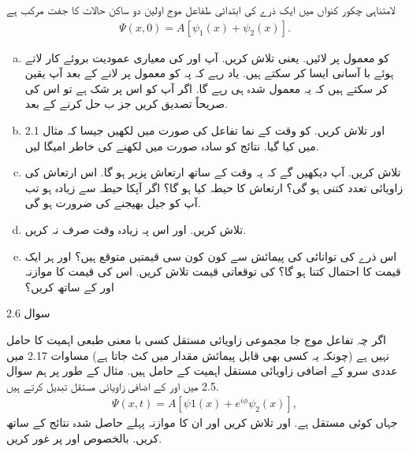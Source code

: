 لامتناہی چکور کنواں میں ایک ذرے کی ابتدائی طفاعل موج اولین دو ساکن حالات کا جفت مرکب ہے 
\begin{align*}
\Psi(x,0) = A[\psi_{1}(x) + \psi_{2}(x)].
\end{align*}
\begin{enumerate}[a.]
\item {} کو معمول پر لائیں. یعنی  تلاش کریں. آپ  اور  کی معیاری عمودیت بروئے کار لاتے ہوئے با آسانی ایسا کر سکتے ہیں. یاد رہے کہ  پہ  کو معمول پر لانے کے بعد آپ یقین کر سکتے ہیں کہ یہ معمول شدہ ہی رہے گا. اگر آپ کو اس پر شک ہے تو اس کی صریحاً تصدیق کریں جز ب حل کرنے کے بعد. 
\item
{} اور  تلاش کریں.  کو وقت کے  نما تفاعل کی صورت میں لکھیں جیسا کہ مثال 2.1 میں کیا گیا. نتائج کو سادہ صورت میں لکھنے کی خاطر امیگا لیں. 
\item 
{} تلاش کریں. آپ دیکھیں گے کہ یہ وقت کے ساتھ ارتعاش پزیر ہو گا. اس ارتعاش کی زاویائی تعدد کتنی ہو گی؟ ارتعاش کا حیطہ کیا ہو گا؟ اگر آپکا حیطہ  سے زیادہ ہو تب آپ کو جیل بھیجنے کی ضرورت ہو گی. 
\item 
{} تلاش کریں. اور اس پہ زیادہ وقت صرف نہ کریں. 
\item
اس ذرے کی توانائی کی پیمائش سے کون کون سی قیمتیں متوقع ہیں؟ اور ہر ایک قیمت کا احتمال کتنا ہو گا؟  کی توقعاتی قیمت تلاش کریں. اس کی قیمت کا موازنہ  اور  کے ساتھ کریں؟
\end{enumerate}

سوال 2.6

   
     
     
     
     
 
 
اگر چہ تفاعل موج جا مجموعی زاویائی مستقل کسی با معنی طبعی اہمیت کا حامل نہیں ہے (چونکہ یہ کسی بھی قابل پیمائش مقدار میں کٹ جاتا ہے)  مساوات 2.17 میں عددی سرو کے اضافی زاویائی مستقل اہمیت کے حامل ہیں. مثال کے طور پر ہم سوال 2.5 میں   اور  کے اضافی زاویائی مستقل تبدیل کرتے ہیں. 
\begin{align*}
\Psi (x,t) = A[\psi{1} (x) + e^{i\phi}\psi_{2}(x)],
\end{align*}
جہاں  کوئی مستقل ہے.  اور  تلاش کریں اور ان کا موازنہ پہلے حاصل شدہ نتائج کے ساتھ کریں. بالخصوص  اور   پر غور کریں. 

